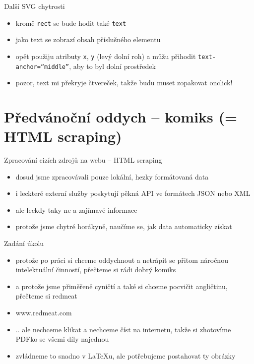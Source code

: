 \documentclass{beamer}
\begin{document}
\begin{frame}{Další SVG chytrosti}
  \begin{itemize}
    \item kromě \texttt{rect} se bude hodit také \texttt{text}
    \item jako text se zobrazí obsah příslušného elementu
    \item opět použiju atributy \texttt{x}, \texttt{y} (levý dolní roh) a můžu přihodit \texttt{text-anchor=``middle''}, aby to byl dolní prostředek
    \item pozor, text mi překryje čtvereček, takže budu muset zopakovat onclick!
  \end{itemize}
\end{frame}

\section{Předvánoční oddych -- komiks (= HTML scraping)}

\begin{frame}{Zpracování cizích zdrojů na webu -- HTML scraping}
  \begin{itemize}
    \item dosud jsme zpracovávali pouze lokální, hezky formátovaná data
    \item i leckteré externí služby poskytují pěkná API ve formátech JSON nebo XML
    \item ale leckdy taky ne a zajímavé informace
    \item protože jsme chytré horákyně, naučíme se, jak data automaticky získat
  \end{itemize}
\end{frame}

\begin{frame}{Zadání úkolu}
  \begin{itemize}
    \item protože po práci si chceme oddychnout a netrápit se přitom náročnou intelektuální činností, přečteme si rádi dobrý komiks
    \item a protože jsme přiměřeně cyničtí a také si chceme pocvičit angličtinu, přečteme si redmeat
    \item www.redmeat.com
    \item .. ale nechceme klikat a nechceme číst na internetu, takže si zhotovíme PDFko se všemi díly najednou
    \item zvládneme to snadno v LaTeXu, ale potřebujeme postahovat ty obrázky
  \end{itemize}
\end{frame}
\end{document}

